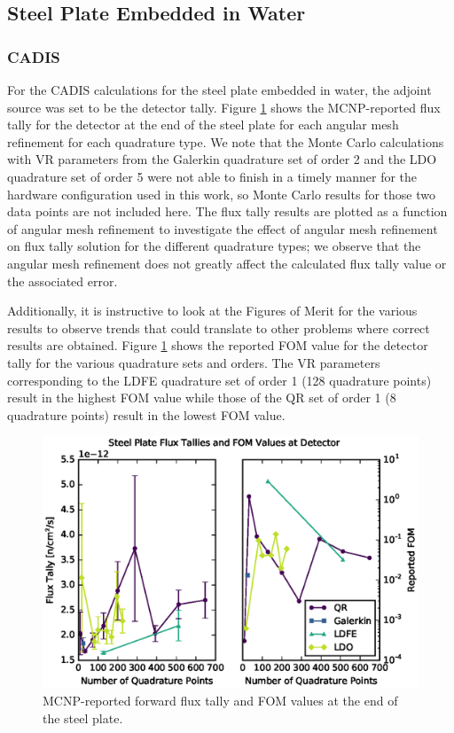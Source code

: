 \documentclass{article} %
\begin{document}
\subsection{Steel Plate Embedded in Water}

\subsubsection{CADIS}

For the CADIS calculations for the steel plate embedded in water, the adjoint
source was set to be the detector tally. Figure \ref{steel-cadis} shows
the MCNP-reported flux tally for the detector at the end of the steel plate
for each angular mesh refinement for each quadrature type. We note that the
Monte Carlo calculations with VR parameters from the Galerkin quadrature
set of order 2 and the LDO quadrature set of order 5 were not able to finish
in a timely manner for the hardware configuration used in this work, so Monte
Carlo results for those two data points are not included here. The flux tally
results are plotted as a function of angular mesh refinement to investigate
the effect of angular mesh refinement on flux tally solution for the different
quadrature types; we observe that the angular mesh refinement does not greatly
affect the calculated flux tally value or the associated error.

Additionally, it is instructive to look at the Figures of Merit for the
various results to observe trends that could translate to other problems where
correct results are obtained. Figure \ref{steel-cadis} shows the reported
FOM value for the detector tally for the various quadrature sets and orders.
The VR parameters corresponding to the LDFE quadrature set of order 1 (128
quadrature points) result in the highest FOM value while those of the QR set of
order 1 (8 quadrature points) result in the lowest FOM value.

\begin{figure}[!htb]
\centering
\includegraphics[max height=0.445\textheight]{steel-cadis.eps}
\caption{MCNP-reported forward flux tally and FOM values at the end of the
         steel plate.}
\label{steel-cadis}
\end{figure}
\end{document}
